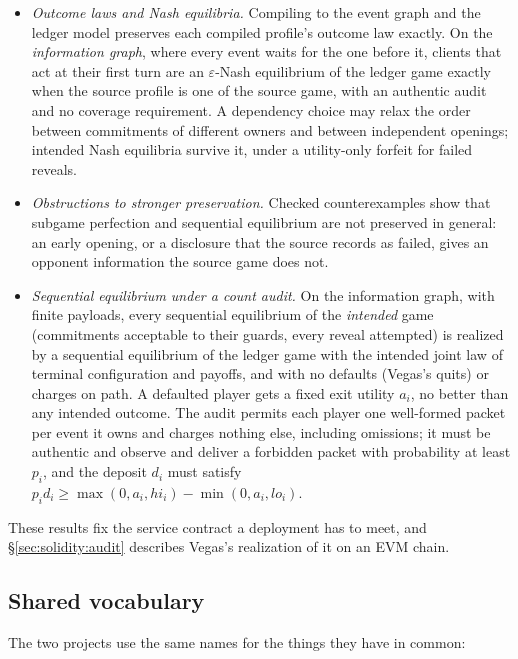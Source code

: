 \begin{itemize}\itemsep2pt
\item \emph{Outcome laws and Nash equilibria.}  Compiling to the
  event graph and the ledger model preserves each compiled
  profile's outcome law exactly.  On the \emph{information graph},
  where every event waits for the one before it, clients that act
  at their first turn are an $\varepsilon$-Nash equilibrium of the
  ledger game exactly when the source profile is one of the source
  game, with an authentic audit and no coverage requirement.  A
  dependency choice may relax the order between commitments of
  different owners and between independent openings; intended Nash
  equilibria survive it, under a utility-only forfeit for failed
  reveals.
\item \emph{Obstructions to stronger preservation.}  Checked
  counterexamples show that subgame perfection and sequential
  equilibrium are not preserved in general: an early opening, or a
  disclosure that the source records as failed, gives an opponent
  information the source game does not.
\item \emph{Sequential equilibrium under a count audit.}  On the
  information graph, with finite payloads, every sequential
  equilibrium of the \emph{intended} game (commitments acceptable to
  their guards, every reveal attempted) is realized by a sequential
  equilibrium of the ledger game with the intended joint law of
  terminal configuration and payoffs, and with no defaults (Vegas's
  quits) or charges on path.  A defaulted player gets a fixed exit
  utility $a_i$, no better than any intended outcome.  The audit
  permits each player one well-formed packet per event it owns and
  charges nothing else, including omissions; it must be authentic
  and observe and deliver a forbidden packet with probability at
  least $p_i$, and the deposit $d_i$ must satisfy
  $p_i d_i \ge \max(0,a_i,\mathit{hi}_i)-\min(0,a_i,\mathit{lo}_i)$.
\end{itemize}

These results fix the service contract a deployment has to meet, and
\S\ref{sec:solidity:audit} describes Vegas's realization of it on
an EVM chain.

\subsection{Shared vocabulary}

The two projects use the same names for the things they have in
common:

